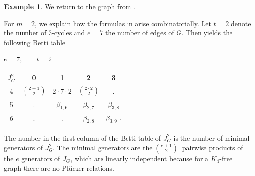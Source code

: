 \documentclass[reqno]{amsart}
\theoremstyle{definition}
\newtheorem{ex}[thm]{Example}
\theoremstyle{remark}
\numberwithin{equation}{section}
\begin{document}
\begin{ex}
We return to the graph from .

     \begin{center}    
    \end{center}
    
For $m = 2$, we explain how the formulas in  arise combinatorially. Let $t=2$ denote the number of $3$-cycles and $e=7$ the number of edges of $G$. Then   yields the following Betti table 
   \begin{center}
    \(e=7,\qquad t=2\)\\
    \vspace{1em}
        \begin{tabular}{c|ccccc}{\(J_{G}^2\)}
            & 0 & 1 & 2 & 3 
            \\
            \hline
            4 & \({{2 +1} \choose 2}\) & \(2\cdot 7 \cdot 2\) & \({2\cdot 2\choose 2}\)& . \\
            5 & . & \(\beta_{1,6}\) & \(\beta_{2,7}\)& \(\beta_{3,8}\)\\
            6 & . & . & \(\beta_{2,8}\) & \(\beta_{3,9}\) .
        \end{tabular}
    \end{center}


The number  in the first column of the Betti table of $J_G^2$ is the number of minimal generators of $J_G^2$. The minimal generators are the $e+1\choose 2$, pairwise products of the $e$ generators of $J_G$, which are linearly independent because for a $K_4$-free graph there are no Pl\"ucker relations.



\end{ex}
\end{document}
